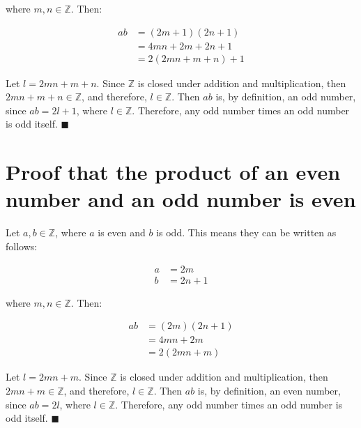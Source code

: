 \documentclass{article}
\begin{document}
\noindent where $m, n \in \mathbb{Z}$. Then:

\begin{align*}
    ab &= (2m + 1)(2n + 1) \\
    &= 4mn + 2m + 2n + 1 \\
    &= 2(2mn + m + n) + 1
\end{align*}

\noindent Let $l = 2mn + m + n$. Since $\mathbb{Z}$ is closed under addition and multiplication, then $2mn + m + n \in \mathbb{Z}$, and therefore, $l \in \mathbb{Z}$. Then $ab$ is, by definition, an odd number, since $ab = 2l + 1$, where $l \in \mathbb{Z}$. Therefore, any odd number times an odd number is odd itself. $\blacksquare$

\section{Proof that the product of an even number and an odd number is even}

Let $a,b \in \mathbb{Z}$, where $a$ is even and $b$ is odd. This means they can be written as follows:

\begin{align*}
    a &= 2m \\
    b &= 2n + 1
\end{align*}

\noindent where $m, n \in \mathbb{Z}$. Then:

\begin{align*}
    ab &= (2m)(2n + 1) \\
    &= 4mn + 2m \\
    &= 2(2mn + m)
\end{align*}

\noindent Let $l = 2mn + m$. Since $\mathbb{Z}$ is closed under addition and multiplication, then $2mn + m \in \mathbb{Z}$, and therefore, $l \in \mathbb{Z}$. Then $ab$ is, by definition, an even number, since $ab = 2l$, where $l \in \mathbb{Z}$. Therefore, any odd number times an odd number is odd itself. $\blacksquare$
\end{document}
